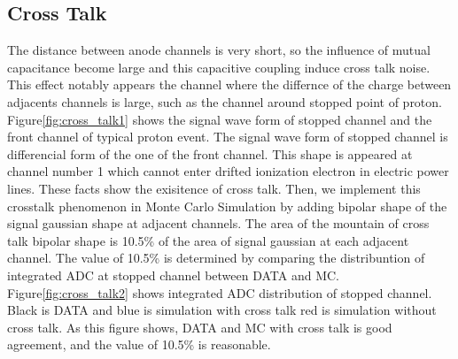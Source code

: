\subsection{Cross Talk}

The distance between anode channels is very short,
so the influence of mutual capacitance become large
and this capacitive coupling induce cross talk noise.
This effect notably appears the channel where the differnce of the charge between adjacents channels is large, such as the channel around stopped point of proton.
Figure\ref{fig:cross_talk1} shows the signal wave form of stopped channel and the front channel of typical proton event.
The signal wave form of stopped channel is differencial form of the one of the front channel.
This shape is appeared at channel number 1 which cannot enter drifted ionization electron in electric power lines.
These facts show the exisitence of cross talk.
Then, we implement this crosstalk phenomenon in Monte Carlo Simulation
by adding bipolar shape of the signal gaussian shape at adjacent channels.
The area of the mountain of cross talk bipolar shape is 10.5\% of the area of signal gaussian at each adjacent channel.
The value of 10.5\% is determined by comparing the distribuntion of integrated ADC at stopped channel between DATA and MC.
Figure\ref{fig:cross_talk2} shows integrated ADC distribution of stopped channel.
Black is DATA and blue is simulation with cross talk red is simulation without cross talk.
As this figure shows, DATA and MC with cross talk is good agreement,
and the value of 10.5\% is reasonable.

